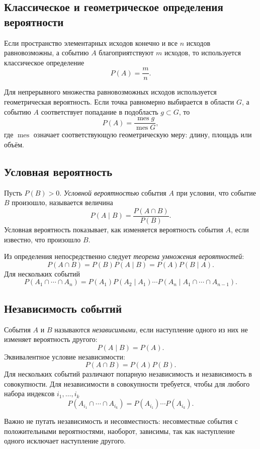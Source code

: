 \subsection{Классическое и геометрическое определения вероятности}

Если пространство элементарных исходов конечно и все $n$ исходов равновозможны,
а событию $A$ благоприятствуют $m$ исходов, то используется классическое определение
\[
    P(A)=\frac{m}{n}.
\]

Для непрерывного множества равновозможных исходов используется геометрическая
вероятность. Если точка равномерно выбирается в области $G$, а событию $A$
соответствует попадание в подобласть $g\subset G$, то
\[
    P(A)=\frac{\operatorname{mes} g}{\operatorname{mes} G},
\]
где $\operatorname{mes}$ означает соответствующую геометрическую меру: длину,
площадь или объём.

\subsection{Условная вероятность}

Пусть $P(B)>0$. \emph{Условной вероятностью} события $A$ при условии, что событие
$B$ произошло, называется величина
\[
    P(A\mid B)=\frac{P(A\cap B)}{P(B)}.
\]
Условная вероятность показывает, как изменяется вероятность события $A$, если
известно, что произошло $B$.

Из определения непосредственно следует \emph{теорема умножения вероятностей}:
\[
    P(A\cap B)=P(B)P(A\mid B)=P(A)P(B\mid A).
\]
Для нескольких событий
\[
    P(A_1\cap\cdots\cap A_n)
    =P(A_1)P(A_2\mid A_1)\cdots
    P(A_n\mid A_1\cap\cdots\cap A_{n-1}).
\]

\subsection{Независимость событий}

События $A$ и $B$ называются \emph{независимыми}, если наступление одного из них
не изменяет вероятность другого:
\[
    P(A\mid B)=P(A).
\]
Эквивалентное условие независимости:
\[
    P(A\cap B)=P(A)P(B).
\]
Для нескольких событий различают попарную независимость и независимость в
совокупности. Для независимости в совокупности требуется, чтобы для любого набора
индексов $i_1,\ldots,i_k$
\[
    P(A_{i_1}\cap\cdots\cap A_{i_k})
    =P(A_{i_1})\cdots P(A_{i_k}).
\]

Важно не путать независимость и несовместность: несовместные события с
положительными вероятностями, наоборот, зависимы, так как наступление одного
исключает наступление другого.

